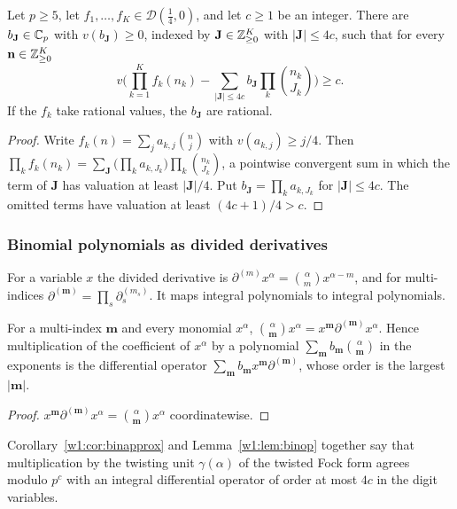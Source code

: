 \begin{corollary}\label{w1:cor:binapprox}
Let $p\ge5$, let $f_1,\dots,f_K\in\mathcal D(\frac14,0)$, and let $c\ge1$ be an integer. There are $b_{\mathbf J}\in\mathbb C_p$ with $v(b_{\mathbf J})\ge0$, indexed by $\mathbf J\in\mathbb Z_{\ge0}^K$ with $\lvert\mathbf J\rvert\le4c$, such that for every $\mathbf n\in\mathbb Z_{\ge0}^K$
\[
v\Big(\prod_{k=1}^Kf_k(n_k)-\sum_{\lvert\mathbf J\rvert\le4c}b_{\mathbf J}\prod_k\binom{n_k}{J_k}\Big)\ge c .
\]
If the $f_k$ take rational values, the $b_{\mathbf J}$ are rational.
\end{corollary}

\begin{proof}
Write $f_k(n)=\sum_ja_{k,j}\binom nj$ with $v(a_{k,j})\ge j/4$. Then $\prod_kf_k(n_k)=\sum_{\mathbf J}\big(\prod_ka_{k,J_k}\big)\prod_k\binom{n_k}{J_k}$, a pointwise convergent sum in which the term of $\mathbf J$ has valuation at least $\lvert\mathbf J\rvert/4$. Put $b_{\mathbf J}=\prod_ka_{k,J_k}$ for $\lvert\mathbf J\rvert\le4c$. The omitted terms have valuation at least $(4c+1)/4>c$.
\end{proof}



\subsubsection{Binomial polynomials as divided derivatives}

For a variable $x$ the divided derivative is $\partial^{(m)}x^\alpha=\binom\alpha mx^{\alpha-m}$, and for multi-indices $\partial^{(\mathbf m)}=\prod_s\partial_s^{(m_s)}$. It maps integral polynomials to integral polynomials.

\begin{lemma}\label{w1:lem:binop}
For a multi-index $\mathbf m$ and every monomial $x^\alpha$, $\binom\alpha{\mathbf m}x^\alpha=x^{\mathbf m}\partial^{(\mathbf m)}x^\alpha$. Hence multiplication of the coefficient of $x^\alpha$ by a polynomial $\sum_{\mathbf m}b_{\mathbf m}\binom\alpha{\mathbf m}$ in the exponents is the differential operator $\sum_{\mathbf m}b_{\mathbf m}x^{\mathbf m}\partial^{(\mathbf m)}$, whose order is the largest $\lvert\mathbf m\rvert$.
\end{lemma}

\begin{proof}
$x^{\mathbf m}\partial^{(\mathbf m)}x^\alpha=\binom\alpha{\mathbf m}x^\alpha$ coordinatewise.
\end{proof}

Corollary~\ref{w1:cor:binapprox} and Lemma~\ref{w1:lem:binop} together say that multiplication by the twisting unit $\gamma(\alpha)$ of the twisted Fock form agrees modulo $p^c$ with an integral differential operator of order at most $4c$ in the digit variables.

